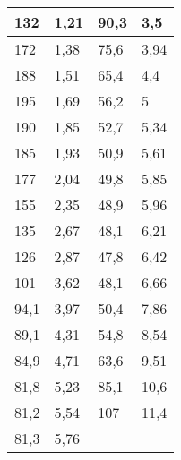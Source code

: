 \begin{table}[h!]
\begin{tabular}{|ll|ll|}
    \multicolumn{1}{|l|}{132}     & 1,21                & \multicolumn{1}{l|}{90,3}    & 3,5           \\ \hline
    \multicolumn{1}{|l|}{172}     & 1,38                & \multicolumn{1}{l|}{75,6}    & 3,94          \\ \hline
    \multicolumn{1}{|l|}{188}     & 1,51                & \multicolumn{1}{l|}{65,4}    & 4,4           \\ \hline
    \multicolumn{1}{|l|}{195}     & 1,69                & \multicolumn{1}{l|}{56,2}    & 5             \\ \hline
    \multicolumn{1}{|l|}{190}     & 1,85                & \multicolumn{1}{l|}{52,7}    & 5,34          \\ \hline
    \multicolumn{1}{|l|}{185}     & 1,93                & \multicolumn{1}{l|}{50,9}    & 5,61          \\ \hline
    \multicolumn{1}{|l|}{177}     & 2,04                & \multicolumn{1}{l|}{49,8}    & 5,85          \\ \hline
    \multicolumn{1}{|l|}{155}     & 2,35                & \multicolumn{1}{l|}{48,9}    & 5,96          \\ \hline
    \multicolumn{1}{|l|}{135}     & 2,67                & \multicolumn{1}{l|}{48,1}    & 6,21          \\ \hline
    \multicolumn{1}{|l|}{126}     & 2,87                & \multicolumn{1}{l|}{47,8}    & 6,42          \\ \hline
    \multicolumn{1}{|l|}{101}     & 3,62                & \multicolumn{1}{l|}{48,1}    & 6,66          \\ \hline
    \multicolumn{1}{|l|}{94,1}    & 3,97                & \multicolumn{1}{l|}{50,4}    & 7,86          \\ \hline
    \multicolumn{1}{|l|}{89,1}    & 4,31                & \multicolumn{1}{l|}{54,8}    & 8,54          \\ \hline
    \multicolumn{1}{|l|}{84,9}    & 4,71                & \multicolumn{1}{l|}{63,6}    & 9,51          \\ \hline
    \multicolumn{1}{|l|}{81,8}    & 5,23                & \multicolumn{1}{l|}{85,1}    & 10,6          \\ \hline
    \multicolumn{1}{|l|}{81,2}    & 5,54                & \multicolumn{1}{l|}{107}     & 11,4          \\ \hline
    \multicolumn{1}{|l|}{81,3}    & 5,76                & \multicolumn{1}{l|}{}        &               \\ \hline

\end{tabular}
\end{table}
